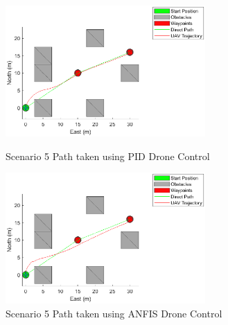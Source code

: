 \begin{figure}[H]
    \centering
    \begin{minipage}[b]{0.45\textwidth}
        \includegraphics[height=5cm,keepaspectratio]{img/scenario5_pid_paths.eps}
        \caption{Scenario 5 Path taken using PID Drone Control}
        \label{fig:Paths5_pid}
    \end{minipage}
    \hfill
    \begin{minipage}[b]{0.45\textwidth}
        \includegraphics[height=5cm,keepaspectratio]{img/scenario5_fis_paths.eps}
        \caption{Scenario 5 Path taken using ANFIS Drone Control}
        \label{fig:Paths5_fis}
    \end{minipage}
\end{figure}